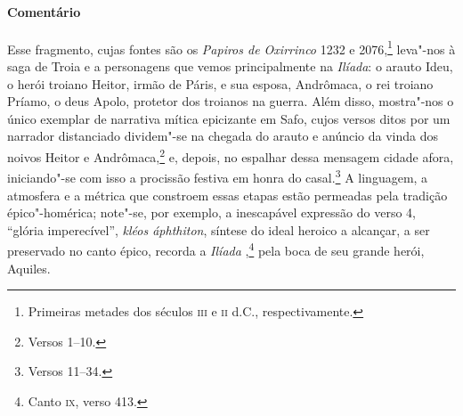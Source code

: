 \medskip

{\paragraph{Comentário} Esse fragmento, cujas fontes são os \textit{Papiros de Oxirrinco} 1232 e 2076,\footnote{Primeiras metades dos séculos \textsc{iii} e \textsc{ii} d.C., respectivamente.} leva"-nos à saga
de Troia e a personagens que vemos principalmente na \textit{Ilíada}: o arauto
Ideu, o herói troiano Heitor, irmão de Páris, e sua esposa, Andrômaca, o rei
troiano Príamo, o deus Apolo, protetor dos troianos na guerra. Além disso,
mostra"-nos o único exemplar de narrativa mítica epicizante
em Safo, cujos versos ditos por um narrador distanciado dividem"-se na
chegada do arauto e anúncio da vinda dos noivos Heitor e Andrômaca,\footnote{Versos
1--10.} e, depois, no espalhar dessa mensagem cidade afora, iniciando"-se com
isso a procissão festiva em honra do casal.\footnote{Versos 11--34.} A linguagem, a
atmosfera e a métrica que constroem essas etapas estão permeadas pela tradição
épico"-homérica; note"-se, por exemplo, a inescapável expressão do verso 4,
``glória imperecível'', \textit{kléos áphthiton}, síntese do ideal heroico a alcançar, a
ser preservado no canto épico, recorda a \textit{Ilíada },\footnote{Canto \textsc{ix}, verso 413.} 
pela boca de seu grande herói, Aquiles.

}
